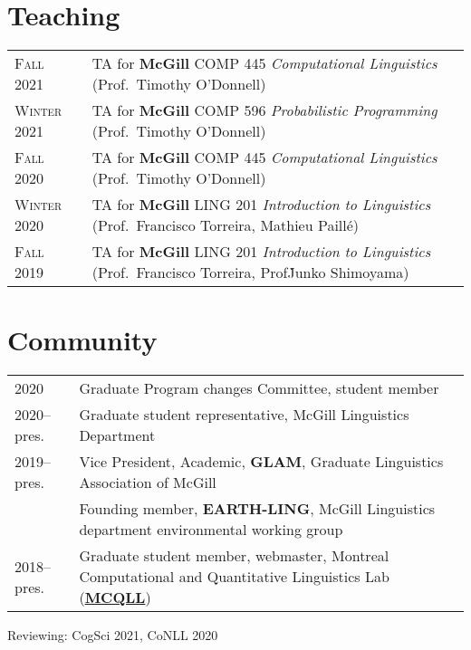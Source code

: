 \documentclass[11pt,a4paper]{article}
\begin{document}
  \section{Teaching}
  \begin{longtable}{p{1.7cm}|p{15cm}}
    \textsc{Fall 2021}&%
      TA for \textbf{McGill} COMP 445 \emph{Computational Linguistics}
      (Prof.\ Timothy O'Donnell)\\
    \textsc{Winter 2021}&%
      TA for \textbf{McGill} COMP 596 \emph{Probabilistic Programming}
      (Prof.\ Timothy O'Donnell)\\
    \textsc{Fall 2020}&%
      TA for \textbf{McGill} COMP 445 \emph{Computational Linguistics}
      (Prof.\ Timothy O'Donnell)\\
    \textsc{Winter 2020}&%
      TA for \textbf{McGill} LING 201 \emph{Introduction to Linguistics}
      (Prof.\ Francisco Torreira, Mathieu Paillé)\\
    \textsc{Fall 2019}&%
      TA for \textbf{McGill} LING 201 \emph{Introduction to Linguistics}
      (Prof.\ Francisco Torreira, Prof\. Junko Shimoyama)\\
  \end{longtable}

  \section{Community}
  \begin{longtable}{p{1.7cm}|p{15cm}}
    2020
    &%
      Graduate Program changes Committee, student member\\
    \textsc{2020--}pres.
    &%
      Graduate student representative, McGill Linguistics Department\\
      \textsc{2019--}pres.
    &%
      Vice President, Academic, \textbf{GLAM}, Graduate Linguistics Association
      of McGill\\
    &%
      Founding member, \textbf{EARTH-LING}, McGill Linguistics department
      environmental working group\\
    \textsc{2018--}pres.
    &%
      Graduate student member, webmaster, Montreal Computational and
      Quantitative Linguistics Lab (\href{http://mcqll.org}{\textbf{MCQLL}})\\
  \end{longtable}
  Reviewing: CogSci 2021, CoNLL 2020

\end{document}
